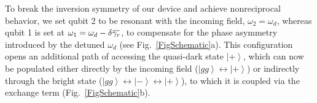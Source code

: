 \documentclass[pra, twocolumn, amsmath, amssymb, notitlepage, longbibliography, showpacs, superscriptaddress]{revtex4-1}
\newcommand{\ket}[1]{\ensuremath{\left|#1\r\rangle}}
\renewcommand{\r}[0]{\right}
\newcommand{\overbar}[1]{\mkern 1.5mu\overline{\mkern-1.5mu#1\mkern-1.5mu}\mkern 1.5mu}
\begin{document}



To break the inversion symmetry of our device and achieve nonreciprocal behavior, we set qubit 2
to be resonant with the incoming field, $\omega_2=\omega_d$,
whereas qubit 1 is set at $\omega_1=\omega_d-\delta\overbar{\gamma_r}$, 
to compensate for the phase asymmetry introduced by the detuned $\omega_d$ (see Fig.~\ref{FigSchematic}a).
This configuration opens an additional path of accessing
the quasi-dark state $\ket{+}$, which can now be populated 
either directly by the incoming field ($\ket{gg}\leftrightarrow\ket{+}$)
or indirectly through the bright state 
($\ket{gg}\leftrightarrow\ket{-}\leftrightarrow\ket{+}$), to which it is 
coupled via the exchange term (Fig.~\ref{FigSchematic}b). 
\end{document}

